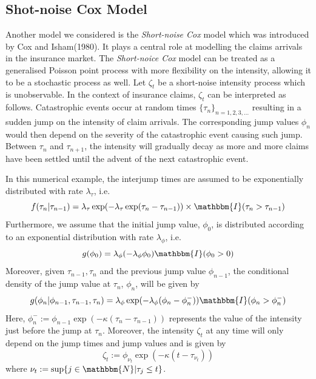 \documentclass[12pt,a4paper]{article}
\begin{document}
\subsection{Shot-noise Cox Model}
Another model we considered is the \textit{Short-noise Cox} model which was introduced by Cox and Isham(1980). It plays a central role at modelling the claims arrivals in the insurance market. The \textit{Short-noice Cox} model can be treated as a generalised Poisson point process with more flexibility on the intensity, allowing it to be a stochastic process as well. Let \(\zeta_t\) be a short-noise intensity process which is unobservable. In the context of insurance claims, \(\zeta_t\) can be interpreted as follows. Catastrophic events occur at random times \(\{\tau_n\}_{n=1,2,3,...}\) resulting in a sudden jump on the intensity of claim arrivals. The corresponding jump values \(\phi_n\) would then depend on the severity of the catastrophic event causing such jump. Between \(\tau_n\) and \(\tau_{n+1}\), the intensity will gradually decay as more and more claims have been settled until the advent of the next catastrophic event. 

In this numerical example, the interjump times are assumed to be exponentially distributed with rate \(\lambda_\tau\), i.e. 
\[
  f(\tau_n|\tau_{n-1}) = \lambda_\tau \exp(-\lambda_\tau\exp(\tau_n-\tau_{n-1}))\times \mathbbm{I}(\tau_n > \tau_{n-1})  
\]
Furthermore, we assume that the initial jump value, \(\phi_0\), is distributed according to an exponential distribution with rate \(\lambda_\phi\), i.e. 
\[
    g(\phi_0)= \lambda_\phi(-\lambda_\phi\phi_0)\mathbbm{I}(\phi_0>0)
\]
Moreover, given \(\tau_{n-1},\tau_n\) and the previous jump value \(\phi_{n-1}\), the conditional density of the jump value at \(\tau_n\), \(\phi_n\), will be given by
\[
    g(\phi_n|\phi_{n-1},\tau_{n-1},\tau_n) = \lambda_\phi \exp(-\lambda_\phi(\phi_n - \phi_{n}^{-}))\mathbbm{I}(\phi_n > \phi_n^{-})
\]
Here, \(\phi_n^{-}:=\phi_{n-1}\exp(-\kappa(\tau_n-\tau_{n-1}))\) represents the value of the intensity just before the jump at \(\tau_n\). Moreover, the intensity \(\zeta_t\) at any time will only depend on the jump times and jump values and is given by 
\[
    \zeta_t := \phi_{\nu_t}\exp(-\kappa(t-\tau_{\nu_t}))
\]
where \(\nu_t:= \sup \{ j \in \mathbbm{N} | \tau_j \leq t\}\). 
\end{document}

